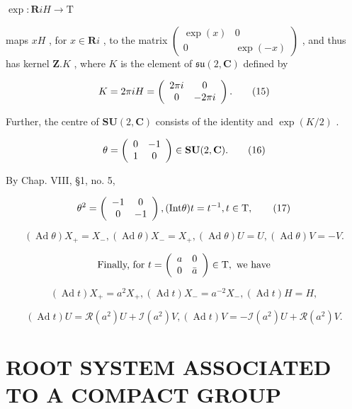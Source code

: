 \(\exp : \mathbf{R}iH \to \mathrm{T}\)

maps \(xH\) , for \(x \in \mathbf{R}i\) , to the matrix \(\left( \begin{array}{cc}\exp (x) & 0\\ 0 & \exp (-x) \end{array} \right)\) , and thus has kernel \(\mathbf{Z}.K\) , where \(K\) is the element of \(\mathfrak{su}(2,\mathbf{C})\) defined by

\[
K = 2 \pi i H = \left( \begin{array}{c c} 2 \pi i & 0 \\ 0 & - 2 \pi i \end{array} \right).\tag{15}
\]

Further, the centre of \(\mathbf{SU}(2,\mathbf{C})\) consists of the identity and \(\exp (K / 2)\) .

\[
\theta = \left( \begin{array}{c c} 0 & - 1 \\ 1 & 0 \end{array} \right) \in \mathbf {S U} (2, \mathbf {C}).\tag{16}
\]

By Chap. VIII, §1, no. 5,

\[
\theta^ {2} = \left( \begin{array}{c c} - 1 & 0 \\ 0 & - 1 \end{array} \right), (\text {Int}   \theta) t = t ^ {- 1}, t \in \text {T},\tag{17}
\]

\[
(\operatorname{Ad} \theta) X _ {+} = X _ {-}, (\operatorname{Ad} \theta) X _ {-} = X _ {+}, (\operatorname{Ad} \theta) U = U, (\operatorname{Ad} \theta) V = - V.\tag{18}
\]

\[
\text {   Finally,   for   } t = \left( \begin{array}{c c} a & 0 \\ 0 & \bar {a} \end{array} \right) \in \mathrm{T}, \text {   we   have   }
\]

\[
(\operatorname{Ad} t) X _ {+} = a ^ {2} X _ {+}, (\operatorname{Ad} t) X _ {-} = a ^ {- 2} X _ {-}, (\operatorname{Ad} t) H = H,\tag{19}
\]

\[
(\operatorname{Ad} t) U = \mathcal {R} (a ^ {2}) U + \mathcal {I} (a ^ {2}) V, (\operatorname{Ad} t) V = - \mathcal {I} (a ^ {2}) U + \mathcal {R} (a ^ {2}) V.\tag{20}
\]

\section{ROOT SYSTEM ASSOCIATED TO A COMPACT GROUP}

